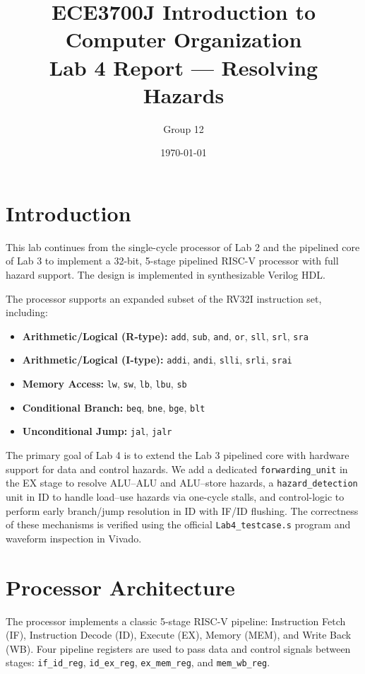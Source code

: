 \documentclass{article}
\title{\textbf{ECE3700J Introduction to Computer Organization \\
Lab 4 Report --- Resolving Hazards}}
\author{\large Group 12 \\ %
}
\date{\today} %
\begin{document}
\maketitle

\newpage
\tableofcontents

\newpage
\section{Introduction}

This lab continues from the single-cycle processor of Lab 2 and the pipelined core of Lab 3 to implement a 32-bit, 5-stage pipelined RISC-V processor with full hazard support. The design is implemented in synthesizable Verilog HDL.

The processor supports an expanded subset of the RV32I instruction set, including:
\begin{itemize}
    \item \textbf{Arithmetic/Logical (R-type):} \texttt{add}, \texttt{sub}, \texttt{and}, \texttt{or}, \texttt{sll}, \texttt{srl}, \texttt{sra}
    \item \textbf{Arithmetic/Logical (I-type):} \texttt{addi}, \texttt{andi}, \texttt{slli}, \texttt{srli}, \texttt{srai}
    \item \textbf{Memory Access:} \texttt{lw}, \texttt{sw}, \texttt{lb}, \texttt{lbu}, \texttt{sb}
    \item \textbf{Conditional Branch:} \texttt{beq}, \texttt{bne}, \texttt{bge}, \texttt{blt}
    \item \textbf{Unconditional Jump:} \texttt{jal}, \texttt{jalr}
\end{itemize}

The primary goal of Lab 4 is to extend the Lab 3 pipelined core with hardware support for data and control hazards. We add a dedicated \texttt{forwarding\_unit} in the EX stage to resolve ALU--ALU and ALU--store hazards, a \texttt{hazard\_detection} unit in ID to handle load--use hazards via one-cycle stalls, and control-logic to perform early branch/jump resolution in ID with IF/ID flushing. The correctness of these mechanisms is verified using the official \texttt{Lab4\_testcase.s} program and waveform inspection in Vivado.

\section{Processor Architecture}

The processor implements a classic 5-stage RISC-V pipeline: Instruction Fetch (IF), Instruction Decode (ID), Execute (EX), Memory (MEM), and Write Back (WB). Four pipeline registers are used to pass data and control signals between stages: \texttt{if\_id\_reg}, \texttt{id\_ex\_reg}, \texttt{ex\_mem\_reg}, and \texttt{mem\_wb\_reg}.
\end{document}
